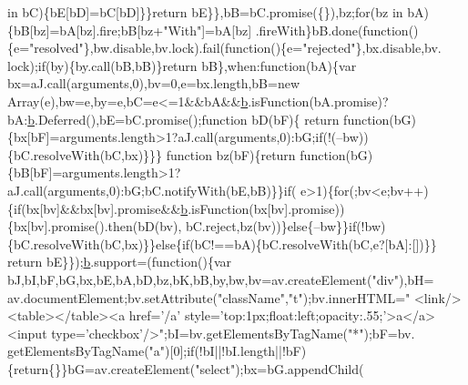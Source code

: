 \begin{DoxyCode}
      in bC)\{bE[bD]=bC[bD]\}\}\textcolor{keywordflow}{return} bE\}\},bB=bC.promise(\{\}),bz;\textcolor{keywordflow}{for}(bz in bA)\{bB[bz]=bA[bz].fire;bB[bz+\textcolor{stringliteral}{"With"}]=bA[bz]
      .fireWith\}bB.done(\textcolor{keyword}{function}()\{e=\textcolor{stringliteral}{"resolved"}\},bw.disable,bv.lock).fail(\textcolor{keyword}{function}()\{e=\textcolor{stringliteral}{"rejected"}\},bx.disable,bv.
      lock);\textcolor{keywordflow}{if}(by)\{by.call(bB,bB)\}\textcolor{keywordflow}{return} bB\},when:\textcolor{keyword}{function}(bA)\{var bx=aJ.call(arguments,0),bv=0,e=bx.length,bB=\textcolor{keyword}{new} 
      Array(e),bw=e,by=e,bC=e<=1&&bA&&\hyperlink{docs_2_programmer's_manual_2html_2jquery_8js_aa4026ad5544b958e54ce5e106fa1c805}{b}.isFunction(bA.promise)?bA:\hyperlink{docs_2_programmer's_manual_2html_2jquery_8js_aa4026ad5544b958e54ce5e106fa1c805}{b}.Deferred(),bE=bC.promise();\textcolor{keyword}{function} bD(bF)\{\textcolor{keywordflow}{
      return} \textcolor{keyword}{function}(bG)\{bx[bF]=arguments.length>1?aJ.call(arguments,0):bG;\textcolor{keywordflow}{if}(!(--bw))\{bC.resolveWith(bC,bx)\}\}\}\textcolor{keyword}{
      function} bz(bF)\{\textcolor{keywordflow}{return} \textcolor{keyword}{function}(bG)\{bB[bF]=arguments.length>1?aJ.call(arguments,0):bG;bC.notifyWith(bE,bB)\}\}\textcolor{keywordflow}{if}(
      e>1)\{\textcolor{keywordflow}{for}(;bv<e;bv++)\{\textcolor{keywordflow}{if}(bx[bv]&&bx[bv].promise&&\hyperlink{docs_2_programmer's_manual_2html_2jquery_8js_aa4026ad5544b958e54ce5e106fa1c805}{b}.isFunction(bx[bv].promise))\{bx[bv].promise().then(bD(bv),
      bC.reject,bz(bv))\}\textcolor{keywordflow}{else}\{--bw\}\}\textcolor{keywordflow}{if}(!bw)\{bC.resolveWith(bC,bx)\}\}\textcolor{keywordflow}{else}\{\textcolor{keywordflow}{if}(bC!==bA)\{bC.resolveWith(bC,e?[bA]:[])\}\}\textcolor{keywordflow}{
      return} bE\}\});\hyperlink{docs_2_programmer's_manual_2html_2jquery_8js_aa4026ad5544b958e54ce5e106fa1c805}{b}.support=(\textcolor{keyword}{function}()\{var bJ,bI,bF,bG,bx,bE,bA,bD,bz,bK,bB,by,bw,bv=av.createElement(\textcolor{stringliteral}{"div"}),bH=
      av.documentElement;bv.setAttribute(\textcolor{stringliteral}{"className"},\textcolor{stringliteral}{"t"});bv.innerHTML=\textcolor{stringliteral}{"   <link/><table></table><a href='/a'
       style='top:1px;float:left;opacity:.55;'>a</a><input type='checkbox'/>"};bI=bv.getElementsByTagName(\textcolor{stringliteral}{"*"});bF=bv.
      getElementsByTagName(\textcolor{stringliteral}{"a"})[0];\textcolor{keywordflow}{if}(!bI||!bI.length||!bF)\{\textcolor{keywordflow}{return}\{\}\}bG=av.createElement(\textcolor{stringliteral}{"select"});bx=bG.appendChild(

\end{DoxyCode}
